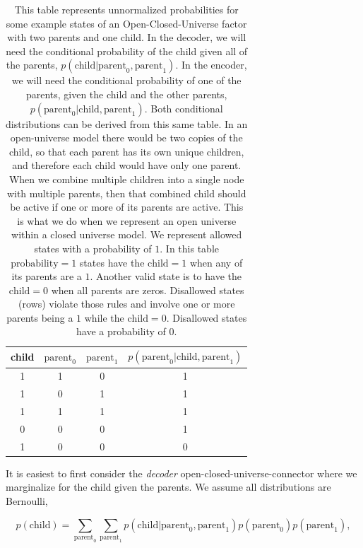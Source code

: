 \documentclass{article}
\begin{document}
\begin{table}[H]
    \setlength{\extrarowheight}{5pt}
    \centering
    \begin{tabular}{c|c|c|c}
        \hline\hline
        child & $\text{parent}_0$ & $\text{parent}_1$ & $p(\text{parent}_0|\text{child}, \text{parent}_1)$ \\[1ex]
        \hline
        1    & 1          & 0          & 1 \\
        1    & 0          & 1          & 1 \\
        1    & 1          & 1          & 1 \\
        0    & 0          & 0          & 1 \\
        1    & 0          & 0          & 0 \\[1ex]
        \hline
    \end{tabular}
    \caption{This table represents unnormalized probabilities for some example states of an Open-Closed-Universe factor with two parents and one child. In the decoder, we will need the conditional probability of the child given all of the parents, $p(\text{child}|\text{parent}_0, \text{parent}_1)$.  In the encoder, we will need the conditional probability of one of the parents, given the child and the other parents, $p(\text{parent}_0|\text{child}, \text{parent}_1)$.  Both conditional distributions can be derived from this same table. In an open-universe model there would be two copies of the child, so that each parent has its own unique children, and therefore each child would have only one parent. When we combine multiple children into a single node with multiple parents, then that combined child should be active if one or more of its parents are active.  This is what we do when we represent an open universe within a closed universe model.  We represent allowed states with a probability of $1$. In this table $\text{probability}=1$ states have the $\text{child}=1$ when any of its parents are a $1$. Another valid state is to have the $\text{child}=0$ when all parents are zeros. Disallowed states (rows) violate those rules and involve one or more parents being a $1$ while the $\text{child}=0$.  Disallowed states have a probability of $0$.}
    \label{tab:open-universe-encoder-appendix}
\end{table}

It is easiest to first consider the \emph{decoder} open-closed-universe-connector where we marginalize for the child given the parents.  We assume all distributions are Bernoulli,

\begin{equation}
    p(\text{child}) = \sum_{\text{parent}_0} \sum_{\text{parent}_1} 
    p(\text{child}| \text{parent}_0, \text{parent}_1 ) p(\text{parent}_0)p(\text{parent}_1),
\end{equation}
\end{document}
